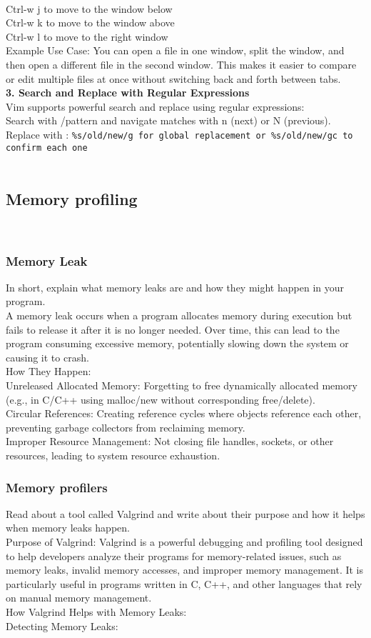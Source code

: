 \documentclass[a4paper,12pt]{article}
\begin{document}
\\Ctrl-w j to move to the window below
\\Ctrl-w k to move to the window above
\\Ctrl-w l to move to the right window
\\Example Use Case:
You can open a file in one window, split the window, and then open a different file in the second window. This makes it easier to compare or edit multiple files at once without switching back and forth between tabs.
\\\textbf{3. Search and Replace with Regular Expressions}
\\Vim supports powerful search and replace using regular expressions:
\\Search with /pattern and navigate matches with n (next) or N (previous).
Replace with :
\texttt{\%s/old/new/g for global replacement or \%s/old/new/gc to confirm each one}
\\
\\
\subsection{Memory profiling}
\\
\subsubsection{Memory Leak}
In short, explain what memory leaks are and how they might happen in your program.
\\A memory leak occurs when a program allocates memory during execution but fails to release it after it is no longer needed. Over time, this can lead to the program consuming excessive memory, potentially slowing down the system or causing it to crash.
\\How They Happen:
\\Unreleased Allocated Memory: Forgetting to free dynamically allocated memory (e.g., in C/C++ using malloc/new without corresponding free/delete).
\\Circular References: Creating reference cycles where objects reference each other, preventing garbage collectors from reclaiming memory.
\\Improper Resource Management: Not closing file handles, sockets, or other resources, leading to system resource exhaustion.
\\
\subsubsection{Memory profilers}
Read about a tool called Valgrind and write about their purpose and how it helps when memory leaks happen.
\\Purpose of Valgrind: Valgrind is a powerful debugging and profiling tool designed to help developers analyze their programs for memory-related issues, such as memory leaks, invalid memory accesses, and improper memory management. It is particularly useful in programs written in C, C++, and other languages that rely on manual memory management.
\\How Valgrind Helps with Memory Leaks:
\\Detecting Memory Leaks:
\end{document}
